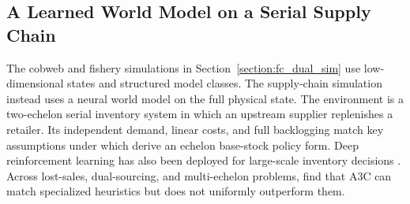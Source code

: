 \subsection{A Learned World Model on a Serial Supply Chain}
\label{section:fc_supply_chain}

The cobweb and fishery simulations in Section~\ref{section:fc_dual_sim} use low-dimensional states and structured model classes. The supply-chain simulation instead uses a neural world model on the full physical state. The environment is a two-echelon serial inventory system in which an upstream supplier replenishes a retailer. Its independent demand, linear costs, and full backlogging match key assumptions under which \citet{ClarkScarf1960inventory} derive an echelon base-stock policy form. Deep reinforcement learning has also been deployed for large-scale inventory decisions \citep{Madeka2022DeepInventory}. Across lost-sales, dual-sourcing, and multi-echelon problems, \citet{Gijsbrechts2022inventory} find that A3C can match specialized heuristics but does not uniformly outperform them.


